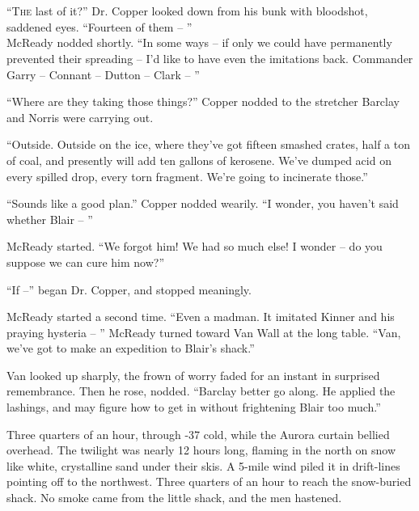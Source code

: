 \documentclass[letterpaper,openany,12pt]{memoir}		%
\begin{document}
\chapter[Chapter 12]{}

\lettrine[lines=3,findent=3pt,nindent=2pt]{``T}{he} last of it?'' Dr. Copper
looked down from his bunk with bloodshot, saddened eyes. ``Fourteen of them --
''\\

McReady nodded shortly. ``In some ways -- if only we could have permanently
prevented their spreading -- I'd like to have even the imitations back.
Commander Garry -- Connant -- Dutton -- Clark -- ''

``Where are they taking those things?'' Copper nodded to the stretcher Barclay
and Norris were carrying out.

``Outside. Outside on the ice, where they've got fifteen smashed crates, half a
ton of coal, and presently will add ten gallons of kerosene. We've dumped acid
on every spilled drop, every torn fragment. We're going to incinerate those.''

``Sounds like a good plan.'' Copper nodded wearily. ``I wonder, you haven't said
whether Blair -- ''

McReady started. ``We forgot him! We had so much else! I wonder -- do you
suppose we can cure him now?''

``If --'' began Dr. Copper, and stopped meaningly.

McReady started a second time. ``Even a madman. It imitated Kinner and his
praying hysteria -- '' McReady turned toward Van Wall at the long table. ``Van,
we've got to make an expedition to Blair's shack.''

Van looked up sharply, the frown of worry faded for an instant in surprised
remembrance. Then he rose, nodded. ``Barclay better go along. He applied the
lashings, and may figure how to get in without frightening Blair too much.''

Three quarters of an hour, through -37 cold, while the Aurora curtain bellied
overhead. The twilight was nearly 12 hours long, flaming in the north on snow
like white, crystalline sand under their skis. A 5-mile wind piled it in
drift-lines pointing off to the northwest. Three quarters of an hour to reach
the snow-buried shack. No smoke came from the little shack, and the men
hastened.
\end{document}
